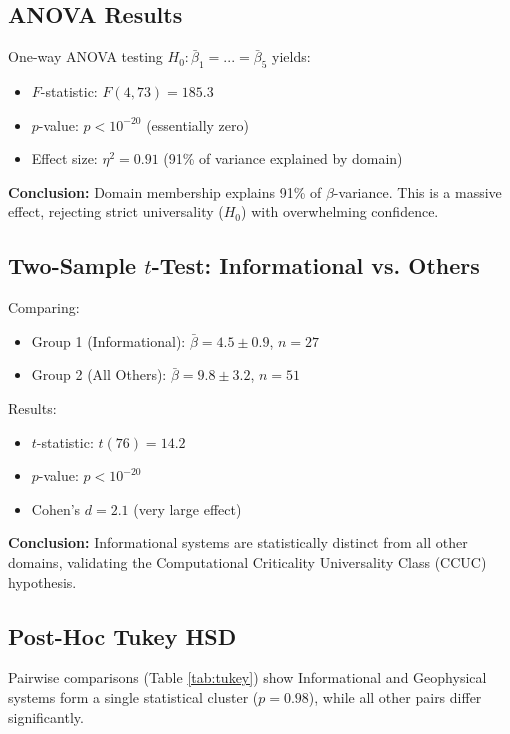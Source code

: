 \documentclass[11pt,a4paper]{article}
\begin{document}
\subsection{ANOVA Results}

One-way ANOVA testing $H_0: \bar{\beta}_1 = ... = \bar{\beta}_5$ yields:

\begin{itemize}
\item $F$-statistic: $F(4,73) = 185.3$
\item $p$-value: $p < 10^{-20}$ (essentially zero)
\item Effect size: $\eta^2 = 0.91$ (91\% of variance explained by domain)
\end{itemize}

\textbf{Conclusion:} Domain membership explains 91\% of $\beta$-variance. This is a massive effect, rejecting strict universality ($H_0$) with overwhelming confidence.

\subsection{Two-Sample $t$-Test: Informational vs. Others}

Comparing:
\begin{itemize}
\item Group 1 (Informational): $\bar{\beta} = 4.5 \pm 0.9$, $n = 27$
\item Group 2 (All Others): $\bar{\beta} = 9.8 \pm 3.2$, $n = 51$
\end{itemize}

Results:
\begin{itemize}
\item $t$-statistic: $t(76) = 14.2$
\item $p$-value: $p < 10^{-20}$
\item Cohen's $d = 2.1$ (very large effect)
\end{itemize}

\textbf{Conclusion:} Informational systems are statistically distinct from all other domains, validating the Computational Criticality Universality Class (CCUC) hypothesis.

\subsection{Post-Hoc Tukey HSD}

Pairwise comparisons (Table \ref{tab:tukey}) show Informational and Geophysical systems form a single statistical cluster ($p = 0.98$), while all other pairs differ significantly.
\end{document}
